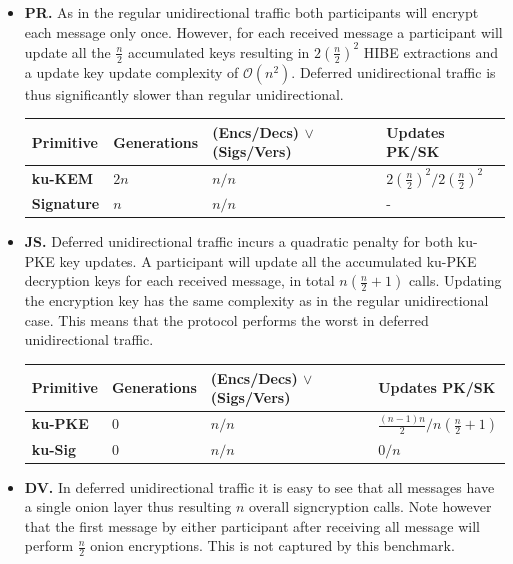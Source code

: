 \documentclass[11pt,a4paper,twoside,openright,bibliography=totoc]{scrbook}
\begin{document}
\begin{itemize}
\item \textbf{PR.} As in the regular unidirectional traffic both
  participants will encrypt each message only once. However, for
  each received message a participant will update all
  the $\frac{n}{2}$ accumulated keys resulting in $2(\frac{n}{2})^2$
  HIBE extractions and a update key update complexity of $\mathcal{O}(n^2)$.
  Deferred unidirectional traffic is thus significantly slower than
  regular unidirectional.
  \begin{center}
    \begin{tabular}{ | l | l | l | l |}
    \hline
    Primitive & Generations & (Encs/Decs) $\vee$ (Sigs/Vers) & Updates PK/SK \\ \hline
    \textbf{ku-KEM} & $2n$ & $n/n$ & $2(\frac{n}{2})^2/2(\frac{n}{2})^2$ \\ \hline
    \textbf{Signature} & $n$ & $n/n$ & - \\  
    \hline
    \end{tabular}
  \end{center}
\item \textbf{JS.} Deferred unidirectional traffic incurs a quadratic
  penalty for both ku-PKE key updates. A participant
  will update all the accumulated ku-PKE decryption keys for
  each received message, in total $n(\frac{n}{2}+1)$ calls.
  Updating the encryption key has the same complexity as in the
  regular unidirectional case. This means that the protocol
  performs the worst in deferred unidirectional traffic.
  \begin{center}
    \begin{tabular}{ | l | l | l | l |}
    \hline
    Primitive & Generations & (Encs/Decs) $\vee$ (Sigs/Vers) & Updates PK/SK \\ \hline
    \textbf{ku-PKE} & $0$ & $n/n$ & $\frac{(n-1)n}{2}/n(\frac{n}{2}+1)$ \\ \hline
    \textbf{ku-Sig} & $0$ & $n/n$ & $0/n$ \\  
    \hline
    \end{tabular}
  \end{center}
\item \textbf{DV.} In deferred unidirectional traffic it is easy to see that
  all messages have a single onion layer thus resulting $n$ overall
  signcryption calls. Note however that the first message
  by either participant after receiving all message will perform
  $\frac{n}{2}$ onion encryptions. This is not captured
  by this benchmark.
  \begin{center}

\end{center}
\end{itemize}
\end{document}

